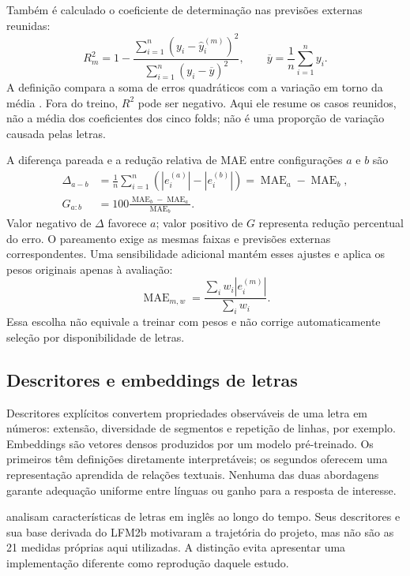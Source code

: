 Também é calculado o coeficiente de determinação nas previsões externas reunidas:
\begin{equation}\label{eq:r2}
 R_m^2=1-\frac{\sum_{i=1}^{n}(y_i-\widehat y_i^{(m)})^2}
 {\sum_{i=1}^{n}(y_i-\overline y)^2},\qquad
 \overline y=\frac{1}{n}\sum_{i=1}^{n}y_i.
\end{equation}
A definição compara a soma de erros quadráticos com a variação em torno da média \cite{james2023}. Fora do treino, $R^2$ pode ser negativo. Aqui ele resume os casos reunidos, não a média dos coeficientes dos cinco folds; não é uma proporção de variação causada pelas letras.

A diferença pareada e a redução relativa de MAE entre configurações $a$ e $b$ são
\begin{align}
 \Delta_{a-b}&=\frac{1}{n}\sum_{i=1}^{n}
 (|e_i^{(a)}|-|e_i^{(b)}|)=\operatorname{MAE}_a-\operatorname{MAE}_b,\label{eq:delta}\\
 G_{a:b}&=100\frac{\operatorname{MAE}_b-\operatorname{MAE}_a}{\operatorname{MAE}_b}.\label{eq:ganho}
\end{align}
Valor negativo de $\Delta$ favorece $a$; valor positivo de $G$ representa redução percentual do erro. O pareamento exige as mesmas faixas e previsões externas correspondentes. Uma sensibilidade adicional mantém esses ajustes e aplica os pesos originais apenas à avaliação:
\begin{equation}\label{eq:maeponderado}
 \operatorname{MAE}_{m,w}=\frac{\sum_i w_i|e_i^{(m)}|}{\sum_i w_i}.
\end{equation}
Essa escolha não equivale a treinar com pesos e não corrige automaticamente seleção por disponibilidade de letras.

\subsection{Descritores e embeddings de letras}
Descritores explícitos convertem propriedades observáveis de uma letra em números: extensão, diversidade de segmentos e repetição de linhas, por exemplo. Embeddings são vetores densos produzidos por um modelo pré-treinado. Os primeiros têm definições diretamente interpretáveis; os segundos oferecem uma representação aprendida de relações textuais. Nenhuma das duas abordagens garante adequação uniforme entre línguas ou ganho para a resposta de interesse.

 analisam características de letras em inglês ao longo do tempo. Seus descritores e sua base derivada do LFM2b \cite{parada2024data} motivaram a trajetória do projeto, mas não são as 21 medidas próprias aqui utilizadas. A distinção evita apresentar uma implementação diferente como reprodução daquele estudo.

